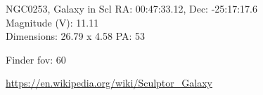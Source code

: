 \begin{block}{NGC0253, Galaxy in Scl}
    RA: 00:47:33.12, Dec: -25:17:17.6 \\ 
    Magnitude (V): 11.11 \\ 
    Dimensions: 26.79 x 4.58 PA: 53 

    Finder fov: 60 

    \url{https://en.wikipedia.org/wiki/Sculptor_Galaxy} 
\end{block}